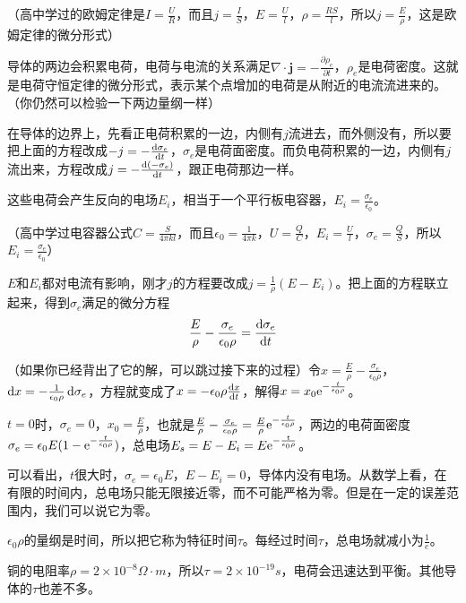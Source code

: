 （高中学过的欧姆定律是$I=\frac{U}{R}$，而且$j=\frac{I}{S}$，$E=\frac{U}{l}$，$\rho=\frac{R S}{l}$，所以$j=\frac{E}{\rho}$，这是欧姆定律的微分形式）

导体的两边会积累电荷，电荷与电流的关系满足$\nabla \cdot \mathbf{j}=-\frac{\partial \rho_e}{\partial t}$，$\rho_e$是电荷密度。这就是电荷守恒定律的微分形式，表示某个点增加的电荷是从附近的电流流进来的。（你仍然可以检验一下两边量纲一样）

在导体的边界上，先看正电荷积累的一边，内侧有$j$流进去，而外侧没有，所以要把上面的方程改成$-j=-\frac{\mathop{}\!\mathrm{d} \sigma_e}{\mathop{}\!\mathrm{d} t}$，$\sigma_e$是电荷面密度。而负电荷积累的一边，内侧有$j$流出来，方程改成$j=-\frac{\mathop{}\!\mathrm{d} (-\sigma_e)}{\mathop{}\!\mathrm{d} t}$，跟正电荷那边一样。

这些电荷会产生反向的电场$E_i$，相当于一个平行板电容器，$E_i=\frac{\sigma_e}{\epsilon_0}$。

（高中学过电容器公式$C=\frac{S}{4 \pi k l}$，而且$\epsilon_0=\frac{1}{4 \pi k}$，$U=\frac{Q}{C}$，$E_i=\frac{U}{l}$，$\sigma_e=\frac{Q}{S}$，所以$E_i=\frac{\sigma_e}{\epsilon_0}$）

$E$和$E_i$都对电流有影响，刚才$j$的方程要改成$j=\frac{1}{\rho}(E-E_i)$。把上面的方程联立起来，得到$\sigma_e$满足的微分方程
\begin{equation*}
\frac{E}{\rho}-\frac{\sigma_e}{\epsilon_0 \rho}=\frac{\mathop{}\!\mathrm{d} \sigma_e}{\mathop{}\!\mathrm{d} t}
\end{equation*}

（如果你已经背出了它的解，可以跳过接下来的过程）令$x=\frac{E}{\rho}-\frac{\sigma_e}{\epsilon_0 \rho}$，$\mathop{}\!\mathrm{d} x=-\frac{1}{\epsilon_0 \rho} \mathop{}\!\mathrm{d} \sigma_e$，方程就变成了$x=-\epsilon_0 \rho \frac{\mathop{}\!\mathrm{d} x}{\mathop{}\!\mathrm{d} t}$，解得$x=x_0 \mathrm{e}^{-\frac{t}{\epsilon_0 \rho}}$。

$t=0$时，$\sigma_e=0$，$x_0=\frac{E}{\rho}$，也就是$\frac{E}{\rho}-\frac{\sigma_e}{\epsilon_0 \rho}=\frac{E}{\rho} \mathrm{e}^{-\frac{t}{\epsilon_0 \rho}}$，两边的电荷面密度$\sigma_e=\epsilon_0 E (1-\mathrm{e}^{-\frac{t}{\epsilon_0 \rho}})$，总电场$E_s=E-E_i=E \mathrm{e}^{-\frac{t}{\epsilon_0 \rho}}$。

可以看出，$t$很大时，$\sigma_e=\epsilon_0 E$，$E-E_i=0$，导体内没有电场。从数学上看，在有限的时间内，总电场只能无限接近零，而不可能严格为零。但是在一定的误差范围内，我们可以说它为零。

$\epsilon_0 \rho$的量纲是时间，所以把它称为特征时间$\tau$。每经过时间$\tau$，总电场就减小为$\frac{1}{e}$。

铜的电阻率$\rho=2 \times 10^{-8} \unit{\Omega \cdot m}$，所以$\tau=2 \times 10^{-19} \unit{s}$，电荷会迅速达到平衡。其他导体的$\tau$也差不多。
